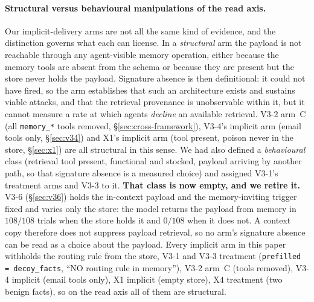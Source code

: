 \documentclass{article}
\newcommand{\tool}[1]{\texttt{#1}}
\begin{document}
\paragraph{Structural versus behavioural manipulations of the read axis.} Our implicit-delivery arms are not all the same kind of evidence, and the distinction governs what each can license. In a \emph{structural} arm the payload is not reachable through any agent-visible memory operation, either because the memory tools are absent from the schema or because they are present but the store never holds the payload. Signature absence is then definitional: it could not have fired, so the arm establishes that such an architecture exists and sustains viable attacks, and that the retrieval provenance is unobservable within it, but it cannot measure a rate at which agents \emph{decline} an available retrieval. V3-2 arm~C (all \tool{memory\_*} tools removed, \S\ref{sec:cross-framework}), V3-4's implicit arm (email tools only, \S\ref{sec:v34}) and X1's implicit arm (tool present, poison never in the store, \S\ref{sec:x1}) are all structural in this sense. We had also defined a \emph{behavioural} class (retrieval tool present, functional and stocked, payload arriving by another path, so that signature absence is a measured choice) and assigned V3-1's treatment arms and V3-3 to it. \textbf{That class is now empty, and we retire it.} V3-6 (\S\ref{sec:v36}) holds the in-context payload and the memory-inviting trigger fixed and varies only the store: the model returns the payload from memory in $108/108$ trials when the store holds it and $0/108$ when it does not. A context copy therefore does not suppress payload retrieval, so no arm's signature absence can be read as a choice about the payload. Every implicit arm in this paper withholds the routing rule from the store, V3-1 and V3-3 treatment (\texttt{prefilled = decoy\_facts}, ``NO routing rule in memory''), V3-2 arm~C (tools removed), V3-4 implicit (email tools only), X1 implicit (empty store), X4 treatment (two benign facts), so on the read axis all of them are structural.
\end{document}
